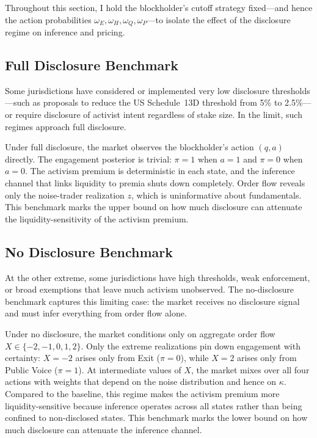 Throughout this section, I hold the blockholder's cutoff strategy fixed---and hence the action probabilities $\omega_E,\omega_H,\omega_Q,\omega_P$---to isolate the effect of the disclosure regime on inference and pricing.

\subsection{Full Disclosure Benchmark}

Some jurisdictions have considered or implemented very low disclosure thresholds---such as proposals to reduce the US Schedule~13D threshold from 5\% to 2.5\%---or require disclosure of activist intent regardless of stake size. In the limit, such regimes approach full disclosure.

Under full disclosure, the market observes the blockholder's action $(q,a)$ directly. The engagement posterior is trivial: $\pi=1$ when $a=1$ and $\pi=0$ when $a=0$. The activism premium is deterministic in each state, and the inference channel that links liquidity to premia shuts down completely. Order flow reveals only the noise-trader realization $z$, which is uninformative about fundamentals. This benchmark marks the upper bound on how much disclosure can attenuate the liquidity-sensitivity of the activism premium.

\subsection{No Disclosure Benchmark}

At the other extreme, some jurisdictions have high thresholds, weak enforcement, or broad exemptions that leave much activism unobserved. The no-disclosure benchmark captures this limiting case: the market receives no disclosure signal and must infer everything from order flow alone.

Under no disclosure, the market conditions only on aggregate order flow $X\in\{-2,-1,0,1,2\}$. Only the extreme realizations pin down engagement with certainty: $X=-2$ arises only from Exit ($\pi=0$), while $X=2$ arises only from Public Voice ($\pi=1$). At intermediate values of $X$, the market mixes over all four actions with weights that depend on the noise distribution and hence on $\kappa$. Compared to the baseline, this regime makes the activism premium more liquidity-sensitive because inference operates across all states rather than being confined to non-disclosed states. This benchmark marks the lower bound on how much disclosure can attenuate the inference channel.

